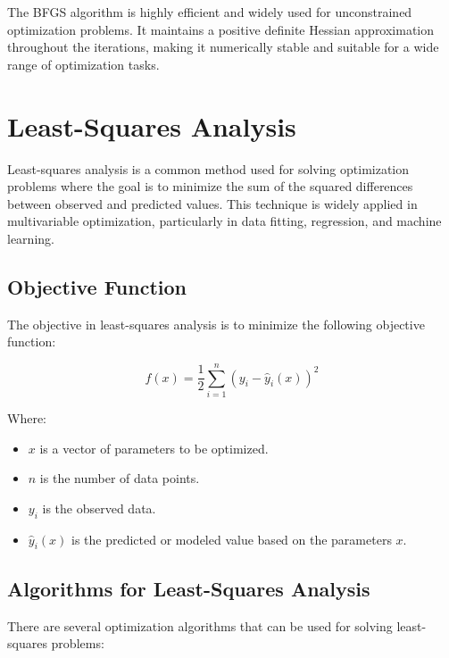\documentclass[a4paper]{article}
\begin{document}
The BFGS algorithm is highly efficient and widely used for unconstrained optimization problems. It maintains a positive definite Hessian approximation throughout the iterations, making it numerically stable and suitable for a wide range of optimization tasks.

\section{Least-Squares Analysis}

Least-squares analysis is a common method used for solving optimization problems where the goal is to minimize the sum of the squared differences between observed and predicted values. This technique is widely applied in multivariable optimization, particularly in data fitting, regression, and machine learning.

\subsection{Objective Function}

The objective in least-squares analysis is to minimize the following objective function:

\[
f(x) = \frac{1}{2} \sum_{i=1}^{n} \left(y_i - \hat{y}_i(x)\right)^2
\]

Where:
\begin{itemize}
    \item $x$ is a vector of parameters to be optimized.
    \item $n$ is the number of data points.
    \item $y_i$ is the observed data.
    \item $\hat{y}_i(x)$ is the predicted or modeled value based on the parameters $x$.
\end{itemize}

\subsection{Algorithms for Least-Squares Analysis}

There are several optimization algorithms that can be used for solving least-squares problems:
\end{document}

